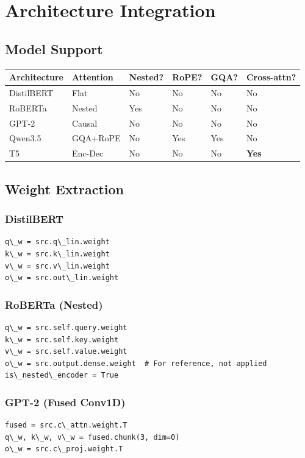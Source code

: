 \section{Architecture Integration}

\subsection{Model Support}

\begin{table}[H]
\centering
\small
\begin{tabular}{llllll}
\toprule
\textbf{Architecture} & \textbf{Attention} & \textbf{Nested?} & \textbf{RoPE?} & \textbf{GQA?} & \textbf{Cross-attn?} \\
\midrule
DistilBERT & Flat & No & No & No & No \\
RoBERTa & Nested & Yes & No & No & No \\
GPT-2 & Causal & No & No & No & No \\
Qwen3.5 & GQA+RoPE & No & Yes & Yes & No \\
T5 & Enc-Dec & No & No & No & \textbf{Yes} \\
\bottomrule
\end{tabular}
\end{table}

\subsection{Weight Extraction}

\subsubsection{DistilBERT}
\begin{lstlisting}
q\_w = src.q\_lin.weight
k\_w = src.k\_lin.weight
v\_w = src.v\_lin.weight
o\_w = src.out\_lin.weight
\end{lstlisting}

\subsubsection{RoBERTa (Nested)}
\begin{lstlisting}
q\_w = src.self.query.weight
k\_w = src.self.key.weight
v\_w = src.self.value.weight
o\_w = src.output.dense.weight  # For reference, not applied
is\_nested\_encoder = True
\end{lstlisting}

\subsubsection{GPT-2 (Fused Conv1D)}
\begin{lstlisting}
fused = src.c\_attn.weight.T
q\_w, k\_w, v\_w = fused.chunk(3, dim=0)
o\_w = src.c\_proj.weight.T
\end{lstlisting}


